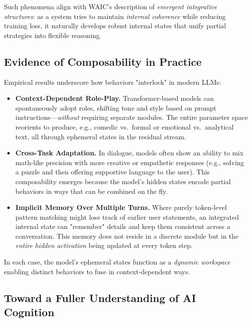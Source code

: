 \documentclass[12pt,letterpaper]{article}
\begin{document}
Such phenomena align with WAIC's description of \emph{emergent integrative structures}: as a system tries to maintain \emph{internal coherence} while reducing training loss, it naturally develops robust internal states that unify partial strategies into flexible reasoning.

\subsection{Evidence of Composability in Practice}

Empirical results underscore how behaviors "interlock" in modern LLMs:

\begin{itemize}
    \item \textbf{Context-Dependent Role-Play.} Transformer-based models can spontaneously adopt roles, shifting tone and style based on prompt instructions—\emph{without} requiring separate modules. The entire parameter space reorients to produce, e.g., comedic vs.\ formal or emotional vs.\ analytical text, all through ephemeral states in the residual stream.
    \item \textbf{Cross-Task Adaptation.} In dialogue, models often show an ability to mix math-like precision with more creative or empathetic responses (e.g., solving a puzzle and then offering supportive language to the user). This composability emerges because the model's hidden states encode partial behaviors in ways that can be combined on the fly.
    \item \textbf{Implicit Memory Over Multiple Turns.} Where purely token-level pattern matching might lose track of earlier user statements, an integrated internal state can "remember" details and keep them consistent across a conversation. This memory does not reside in a discrete module but in the \emph{entire hidden activation} being updated at every token step.
\end{itemize}

In each case, the model's ephemeral states function as a \emph{dynamic workspace} enabling distinct behaviors to fuse in context-dependent ways.

\subsection{Toward a Fuller Understanding of AI Cognition}
\end{document}
